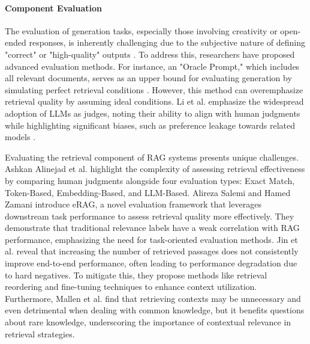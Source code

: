 \paragraph{Component Evaluation}
The evaluation of generation tasks, especially those involving creativity or open-ended responses, is inherently challenging due to the subjective nature of defining "correct" or "high-quality" outputs \cite{Yu.2024}. To address this, researchers have proposed advanced evaluation methods. For instance, an "Oracle Prompt," which includes all relevant documents, serves as an upper bound for evaluating generation by simulating perfect retrieval conditions \cite{Krishna.19.09.2024}. However, this method can overemphasize retrieval quality by assuming ideal conditions. Li et al. emphasize the widespread adoption of LLMs as judges, noting their ability to align with human judgments while highlighting significant biases, such as preference leakage towards related models \cite{Li.13.01.2025}.

Evaluating the retrieval component of RAG systems presents unique challenges. Ashkan Alinejad et al.\cite{AshkanAlinejad.2024} highlight the complexity of assessing retrieval effectiveness by comparing human judgments alongside four evaluation types: Exact Match, Token-Based, Embedding-Based, and LLM-Based. Alireza Salemi and Hamed Zamani \cite{Salemi.2024} introduce eRAG, a novel evaluation framework that leverages downstream task performance to assess retrieval quality more effectively. They demonstrate that traditional relevance labels have a weak correlation with RAG performance, emphasizing the need for task-oriented evaluation methods. Jin et al.\cite{Jin.08.10.2024} reveal that increasing the number of retrieved passages does not consistently improve end-to-end performance, often leading to performance degradation due to hard negatives. To mitigate this, they propose methods like retrieval reordering and fine-tuning techniques to enhance context utilization. Furthermore, Mallen et al. \cite{Mallen.2022} find that retrieving contexts may be unnecessary and even detrimental when dealing with common knowledge, but it benefits questions about rare knowledge, underscoring the importance of contextual relevance in retrieval strategies.


